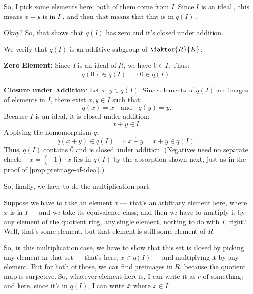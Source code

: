 \begin{proofWrapper}
\begin{speech}[00:25:06 - 00:26:54]
So, I pick some elements here; both of them come from $I$. Since $I$ is an ideal , this means $x + y$ is in $I$ , and then that means that that is in $q(I)$ .

Okay? So, that shows that $q(I)$ has zero and it's closed under addition.
\end{speech}

\begin{content}
We verify that $q(I)$ is an additive subgroup of $\faktor{R}{K}$:

\textbf{Zero Element:}
Since $I$ is an ideal of $R$, we have $0 \in I$. Thus:
\[
q(0) \in q(I) \implies \bar{0} \in q(I).
\]

\textbf{Closure under Addition:}
Let $\bar{x}, \bar{y} \in q(I)$. Since elements of $q(I)$ are images of elements in $I$, there exist $x, y \in I$ such that:
\[
q(x) = \bar{x} \quad \text{and} \quad q(y) = \bar{y}.
\]
Because $I$ is an ideal, it is closed under addition:
\[
x + y \in I.
\]
Applying the homomorphism $q$:
\[
q(x + y) \in q(I) \implies \overline{x + y} = \bar{x} + \bar{y} \in q(I).
\]
Thus, $q(I)$ contains $\bar{0}$ and is closed under addition. (Negatives need no separate check: $-\bar{x} = (-\bar{1}) \cdot \bar{x}$ lies in $q(I)$ by the absorption shown next, just as in the proof of \cref{prop:preimage-of-ideal}.)
\end{content}

\begin{speech}[00:26:54 - 00:28:26]
So, finally, we have to do the multiplication part.

Suppose we have to take an element $x$ --- that's an arbitrary element here, where $x$ is in $I$ --- and we take its equivalence class; and then we have to multiply it by any element of the quotient ring, any single element, nothing to do with $I$, right? Well, that's some element, but that element is still some element of $R$.

So, in this multiplication case, we have to show that this set is closed by picking any element in that set --- that's here, $\bar{x} \in q(I)$  --- and multiplying it by any element. But for both of those, we can find preimages in $R$, because the quotient map is surjective. So, whatever element here is, I can write it as $\bar{r}$ of something; and here, since it's in $q(I)$, I can write $\bar{x}$ where $x \in I$.


\end{speech}
\end{proofWrapper}
